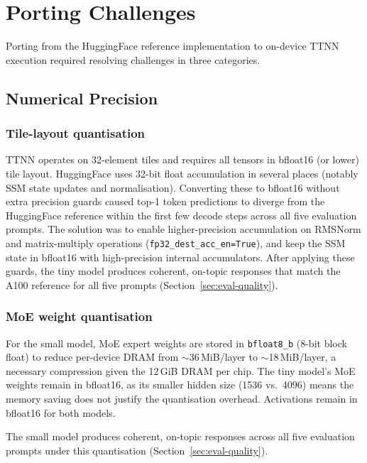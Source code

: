 \section{Porting Challenges}
\label{sec:challenges}

Porting from the HuggingFace reference implementation to on-device TTNN execution required resolving challenges in three categories.

\subsection{Numerical Precision}

\subsubsection{Tile-layout quantisation}

TTNN operates on 32-element tiles and requires all tensors in bfloat16 (or lower) tile layout. HuggingFace uses 32-bit float accumulation in several places (notably SSM state updates and normalisation). Converting these to bfloat16 without extra precision guards caused top-1 token predictions to diverge from the HuggingFace reference within the first few decode steps across all five evaluation prompts. The solution was to enable higher-precision accumulation on RMSNorm and matrix-multiply operations (\texttt{fp32\_dest\_acc\_en=True}), and keep the SSM state in bfloat16 with high-precision internal accumulators. After applying these guards, the tiny model produces coherent, on-topic responses that match the A100 reference for all five prompts (Section~\ref{sec:eval-quality}).

\subsubsection{MoE weight quantisation}

For the small model, MoE expert weights are stored in \texttt{bfloat8\_b} (8-bit block float) to reduce per-device DRAM from $\sim$36\,MiB/layer to $\sim$18\,MiB/layer, a necessary compression given the 12\,GiB DRAM per chip. The tiny model's MoE weights remain in bfloat16, as its smaller hidden size (1536 vs.\ 4096) means the memory saving does not justify the quantisation overhead. Activations remain in bfloat16 for both models.

The small model produces coherent, on-topic responses across all five evaluation prompts under this quantisation (Section~\ref{sec:eval-quality}).

